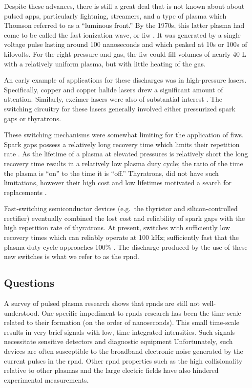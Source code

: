 Despite these advances, there is still a great deal that is not known about
about pulsed \acs{app}s, particularly lightning, streamers, and a type of plasma
which Thomson referred to as a ``luminous front.'' By the 1970s, this latter
plasma had come to be called the fast ionization wave, or \acs{fiw}
\cite{Vasilyak1994}. It was generated by a single voltage pulse lasting around
100 nanoseconds and which peaked at 10s or 100s of kilovolts. For the right
pressure and gas, the \acs{fiw} could fill volumes of nearly 40 L with a
relatively uniform plasma, but with little heating of the gas.

An early example of applications for these discharges was in high-pressure
lasers. Specifically, copper \cite{Kushner1983} and copper halide
\cite{Pack1977} lasers drew a significant amount of attention. Similarly,
excimer lasers were also of substantial interest \cite{Shimada1985}. The
switching circuitry for these lasers generally involved either pressurized spark
gaps or thyratrons.

These switching mechanisms were somewhat limiting for the application of
\acs{fiw}s. Spark gaps possess a relatively long recovery time which limits
their repetition rate \cite{Moran1991}. As the lifetime of a plasma at elevated
pressures is relatively short the long recovery time results in a relatively low
plasma duty cycle; the ratio of the time the plasma is ``on'' to the time it is
``off.'' Thyratrons, did not have such limitations, however their high cost and
low lifetimes motivated a search for replacements \cite{Partlo1995}.

Fast-switching semiconductor devices (e.g.\ the thyristor and silicon-controlled
rectifier) eventually combined the lost cost and reliability of spark gaps with
the high repetition rate of thyratrons. At present, switches with sufficiently
low recovery times which can reliably operate at 100 kHz; sufficiently fast that
the plasma duty cycle approaches 100\% \cite{Efanov1997}. The discharge produced
by the use of these new switches is what we refer to as the \acs{rpnd}.

\subsection{Questions}

A survey of pulsed plasma research shows that \acs{rpnd}s are still not
well-understood. One specific impediment to \acs{rpnd}s research has been the
time-scale related to their formation (on the order of nanoseconds). This small
time-scale results in very brief signals with low, time-integrated intensities.
Such signals necessitate sensitive detectors and diagnostic equipment
Unfortunately, such devices are often susceptible to the broadband electronic
noise generated by the current pulses in the \acs{rpnd}. Other \acs{rpnd}
properties such as the high collisionality relative to other plasmas and the
large electric fields have also hindered experimental measurements.

